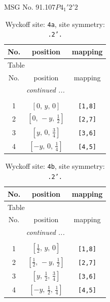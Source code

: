 \documentclass[fleqn,8pt]{jsarticle}
\begin{document}
\setcounter{MaxMatrixCols}{32}

\renewcommand{\tablename}{Table~}
\renewcommand{\figurename}{Figure~}
\begin{center}
\LARGE
MSG No. 91.107\quad$P4_{1}'2'2$
\end{center}
\renewcommand{\arraystretch}{1.2}
\begin{longtable}{ccc}
\caption{Wyckoff site: {\tt 4a}, site symmetry: {\tt .2'.}}
 \\
 \hline \hline
No. & position & mapping \\ \hline \endfirsthead

\multicolumn{2}{l}{\tablename\ \thetable{}} \\
 \hline \hline
No. & position & mapping \\ \hline \endhead

 \hline \hline
\multicolumn{2}{r}{\footnotesize\it continued ...} \\ \endfoot

 \hline \hline
\multicolumn{2}{r}{} \\ \endlastfoot

1 & $\left[ 0,\, y,\, 0 \right]$ & {\tt [1,8]} \\ \hline
2 & $\left[ 0,\, - y,\, \frac{1}{2} \right]$ & {\tt [2,7]} \\ \hline
3 & $\left[ y,\, 0,\, \frac{3}{4} \right]$ & {\tt [3,6]} \\ \hline
4 & $\left[ - y,\, 0,\, \frac{1}{4} \right]$ & {\tt [4,5]} \\
\end{longtable}
\renewcommand{\arraystretch}{1.2}
\begin{longtable}{ccc}
\caption{Wyckoff site: {\tt 4b}, site symmetry: {\tt .2'.}}
 \\
 \hline \hline
No. & position & mapping \\ \hline \endfirsthead

\multicolumn{2}{l}{\tablename\ \thetable{}} \\
 \hline \hline
No. & position & mapping \\ \hline \endhead

 \hline \hline
\multicolumn{2}{r}{\footnotesize\it continued ...} \\ \endfoot

 \hline \hline
\multicolumn{2}{r}{} \\ \endlastfoot

1 & $\left[ \frac{1}{2},\, y,\, 0 \right]$ & {\tt [1,8]} \\ \hline
2 & $\left[ \frac{1}{2},\, - y,\, \frac{1}{2} \right]$ & {\tt [2,7]} \\ \hline
3 & $\left[ y,\, \frac{1}{2},\, \frac{3}{4} \right]$ & {\tt [3,6]} \\ \hline
4 & $\left[ - y,\, \frac{1}{2},\, \frac{1}{4} \right]$ & {\tt [4,5]} \\
\end{longtable}
\end{document}
